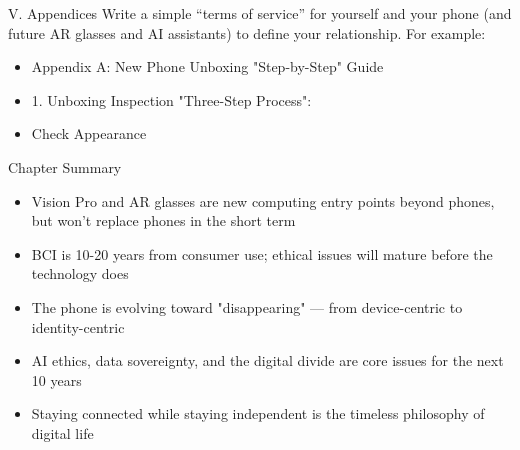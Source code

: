 \begin{tcbpractice}{V. Appendices}
Write a simple “terms of service” for yourself and your phone (and future AR glasses and AI assistants) to define your relationship. For example:

\begin{itemize}
  \item Appendix A: New Phone Unboxing "Step-by-Step" Guide
  \item 1. Unboxing Inspection "Three-Step Process":
  \item Check Appearance
\end{itemize}

\end{tcbpractice}

\begin{tcbsummary}{Chapter Summary}
\begin{itemize}
  \item Vision Pro and AR glasses are new computing entry points beyond phones, but won't replace phones in the short term
  \item BCI is 10-20 years from consumer use; ethical issues will mature before the technology does
  \item The phone is evolving toward "disappearing" — from device-centric to identity-centric
  \item AI ethics, data sovereignty, and the digital divide are core issues for the next 10 years
  \item Staying connected while staying independent is the timeless philosophy of digital life
\end{itemize}

\end{tcbsummary}
